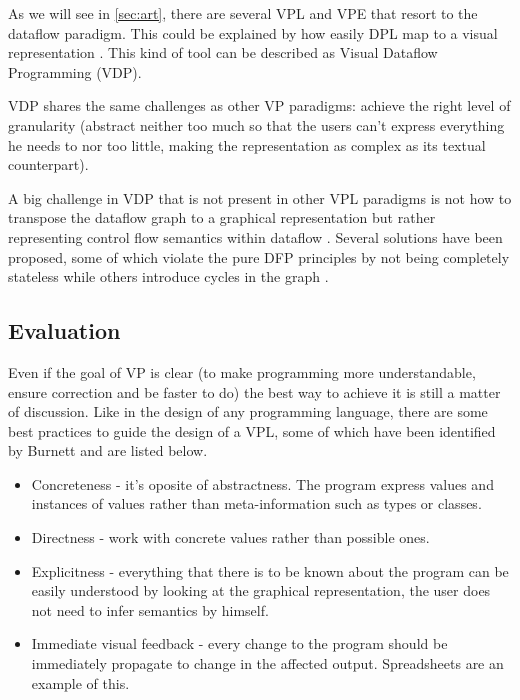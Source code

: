 \begin{itemsize}
As we will see in \ref{sec:art}, there are several VPL and VPE that resort to the
dataflow paradigm. This could be explained by how easily DPL map to
a visual representation \cite{Johnston2004}. This kind of tool can be described
as Visual Dataflow Programming (VDP).

VDP shares the same challenges as other VP paradigms: achieve the right level
of granularity (abstract neither too much so that the users can't express everything
he needs to nor too little, making the representation as complex as its textual
counterpart).

A big challenge in VDP that is not present in other VPL paradigms
is not how to transpose the dataflow graph to a graphical
representation but rather representing control flow semantics within dataflow
\cite{Cox2011}. Several solutions have been proposed, some of which violate
the pure DFP principles by not being completely stateless while others introduce
cycles in the graph \cite{Mosconi2000}.

\subsection{Evaluation}
\label{sec:eval}

Even if the goal of VP is clear (to make programming more understandable, ensure
correction and be faster to do) the best way to achieve it is still a matter of
discussion. Like in the design of any programming language, there are some
best practices to guide the design of a VPL, some of which have been identified
by Burnett \cite{Burnett1999} and are listed below.

\begin{itemize}
  \item Concreteness - it's oposite of abstractness. The program express values
and instances of values rather than meta-information such as types or classes.
  \item Directness - work with concrete values rather than possible ones.
  \item Explicitness - everything that there is to be known about the program
can be easily understood by looking at the graphical representation, the
user does not need to infer semantics by himself.
  \item Immediate visual feedback - every change to the program should be
immediately propagate to change in the affected output. Spreadsheets are an example of
this.
\end{itemize}


\end{itemsize}
